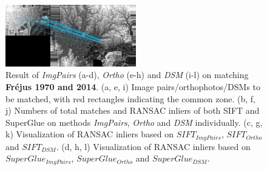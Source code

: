 \begin{figure}[htbp]
\begin{center}
{\begin{minipage}[t]{0.48\linewidth}
				\centering
				\includegraphics[width=5.7cm]{images/Chapitre3/Homol-SIFT2Step-Rough-2DRANSAC_MEC-Malt_Tapas_1970_MEC-Malt_2014.png}
			\end{minipage}%
		}
		\caption{{\scriptsize Result of \textit{ImgPairs} (a-d), \textit{Ortho} (e-h) and \textit{DSM} (i-l) on matching \textbf{Fr{\'e}jus 1970 and 2014}. (a, e, i) Image pairs/orthophotos/DSMs to be matched, with red rectangles indicating the common zone. (b, f, j) Numbers of total matches and RANSAC inliers of both SIFT and SuperGlue on methods \textit{ImgPairs}, \textit{Ortho} and \textit{DSM} individually. (c, g, k) Visualization of RANSAC inliers based on $SIFT_{ImgPairs}$, $SIFT_{Ortho}$ and $SIFT_{DSM}$. (d, h, l) Visualization of RANSAC inliers based on $SuperGlue_{ImgPairs}$, $SuperGlue_{Ortho}$ and $SuperGlue_{DSM}$.}}
		\label{MatchVizFrejus1970DSM}
	\end{center}
\end{figure} 


